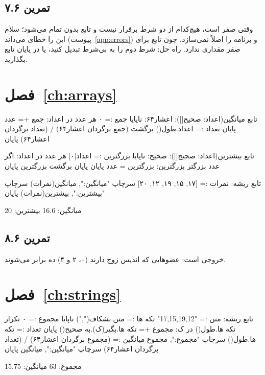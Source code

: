 \subsection*{تمرین ۷.۶}
وقتی  صفر است، هیچ‌کدام از دو شرط برقرار نیست و تابع بدون
 تمام می‌شود؛ سلام این را خطای  می‌داند (پیوست~\ref{app:errors})
و برنامه را اصلاً نمی‌سازد، چون تابع برای صفر مقداری ندارد. راه حل: شرط دوم را
به  بی‌شرط تبدیل کنید، یا در پایان تابع
 بگذارید.

\section*{فصل~\ref{ch:arrays}}

\begin{salamfa}
تابع میانگین(اعداد: صحیح[]): اعشار۶۴:
    ناپایا جمع := ۰
    هر عدد در اعداد:
        جمع += عدد
    پایان
    تعداد := اعداد.طول()
    برگشت (جمع برگردان اعشار۶۴) / (تعداد برگردان اعشار۶۴)
پایان

تابع بیشترین(اعداد: صحیح[]): صحیح:
    ناپایا بزرگترین := اعداد[۰]
    هر عدد در اعداد:
        اگر عدد بزرگتر بزرگترین: بزرگترین = عدد پایان
    پایان
    برگشت بزرگترین
پایان

تابع ریشه:
    نمرات := [۱۷, ۱۵, ۱۹, ۱۲, ۲۰]
    سرچاپ "میانگین:", میانگین(نمرات)
    سرچاپ "بیشترین:", بیشترین(نمرات)
پایان
\end{salamfa}
\begin{outputfa}
میانگین: 16.6
بیشترین: 20
\end{outputfa}

\subsection*{تمرین ۸.۶}
خروجی \code{[10, 2, 30, 4, 50]} است: عضوهایی که اندیس زوج دارند (۰، ۲
و ۴) ده برابر می‌شوند.

\section*{فصل~\ref{ch:strings}}

\begin{salamfa}
تابع ریشه:
    متن := "17,15,19,12"
    تکه ها := متن.بشکاف(",")
    ناپایا مجموع := ۰
    تکرار تکه ها.طول() در ک:
        مجموع += تکه ها.بگیر(ک).به صحیح()
    پایان
    تعداد := تکه ها.طول()
    سرچاپ "مجموع:", مجموع
    میانگین := (مجموع برگردان اعشار۶۴) / (تعداد برگردان اعشار۶۴)
    سرچاپ "میانگین:", میانگین
پایان
\end{salamfa}
\begin{outputfa}
مجموع: 63
میانگین: 15.75
\end{outputfa}
